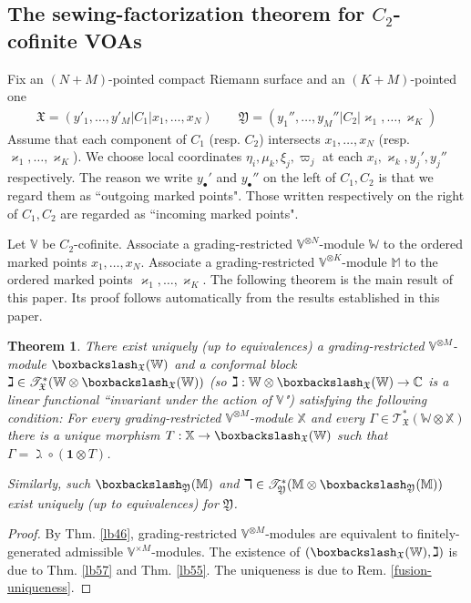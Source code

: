 \documentclass[11pt,b5paper,notitlepage]{article}
\theoremstyle{definition}
\theoremstyle{plain}
\newtheorem{thm}[df]{Theorem}
\newcommand{\fk}{\mathfrak}
\newcommand{\idt}{\mathbf{1}}
\newcommand{\scr}{\mathscr}
\newcommand{\blt}{\bullet}
\newcommand{\Vbb}{\mathbb V}
\newcommand{\Xbb}{\mathbb X}
\newcommand{\Wbb}{\mathbb W}
\newcommand{\Mbb}{\mathbb M}
\newcommand{\Cbb}{\mathbb C}
\newcommand{\<}{\left\langle}
\renewcommand{\>}{\right\rangle}
\newcommand{\fx}{\mathfrak{X}}
\newcommand{\bbs}{\boxbackslash}
\numberwithin{equation}{section}
\begin{document}
\subsection{The sewing-factorization theorem for $C_2$-cofinite VOAs}\label{lb83}



Fix an $(N+M)$-pointed compact Riemann surface and an $(K+M)$-pointed one
\begin{gather} \label{eq166}
\fx=(y'_1,\dots,y'_M|C_1|x_1,\dots,x_N)\qquad \fk Y=(y_1'',\dots,y_M''|C_2|\varkappa_1,\dots,\varkappa_K)
\end{gather}
Assume that each component of $C_1$ (resp. $C_2$) intersects $x_1,\dots,x_N$ (resp. $\varkappa_1,\dots,\varkappa_K$). We choose local coordinates $\eta_i,\mu_k,\xi_j,\varpi_j$ at each $x_i,\varkappa_k,y_j',y_j''$ respectively. The reason we write $y_\blt'$ and $y_\blt''$ on the left of $C_1,C_2$ is that we regard them as ``outgoing marked points". Those written respectively on the right of $C_1,C_2$ are regarded as ``incoming marked points". 


Let $\Vbb$ be $C_2$-cofinite. Associate a grading-restricted $\Vbb^{\otimes N}$-module $\Wbb$ to the ordered marked points $x_1,\dots,x_N$. Associate a grading-restricted $\Vbb^{\otimes K}$-module $\Mbb$ to the ordered marked points $\varkappa_1,\dots,\varkappa_K$. The following theorem is the main result of this paper. Its proof follows automatically from the results established in this paper.


\begin{thm} \label{lb80}
There exist uniquely (up to equivalences) a grading-restricted $\Vbb^{\otimes M}$-module $\bbs_{\fx}(\Wbb)$ and a conformal block $\gimel\in\scr T_{\fx}^*(\Wbb\otimes \bbs_{\fx}(\Wbb))$ (so $\gimel:\Wbb\otimes\bbs_{\fx}(\Wbb)\rightarrow\Cbb$ is a linear functional ``invariant under the action of $\Vbb$") satisfying the following condition: For every grading-restricted $\Vbb^{\otimes M}$-module $\Xbb$ and every $\Gamma\in\scr T_{\fx}^*(\Wbb\otimes\Xbb)$ there is a unique morphism $T:\Xbb\rightarrow\bbs_\fx(\Wbb)$ such that $\Gamma=\gimel\circ(\idt\otimes T)$.

Similarly, such $\bbs_{\fk Y}(\Mbb)$ and $\daleth\in\scr T_{\fk Y}^*(\Mbb\otimes\bbs_{\fk Y}(\Mbb))$ exist uniquely (up to equivalences) for $\fk Y$.
\end{thm}
\begin{proof}
By Thm. \ref{lb46}, grading-restricted $\Vbb^{\otimes M}$-modules are equivalent to finitely-generated admissible $\Vbb^{\times M}$-modules. The existence of $(\bbs_\fx(\Wbb),\gimel)$ is due to Thm. \ref{lb57} and Thm. \ref{lb55}. The uniqueness is due to Rem. \ref{fusion-uniqueness}.
\end{proof}
\end{document}
